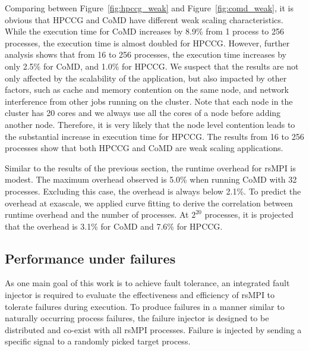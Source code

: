 Comparing between Figure~\ref{fig:hpccg_weak} and Figure~\ref{fig:comd_weak}, it is obvious that HPCCG and CoMD have different weak scaling characteristics. While the execution time for CoMD increases by 8.9\% from 1 process to 256 processes, the execution time is almost doubled for HPCCG. However, further analysis shows that from 16 to 256 processes, the execution time increases by only 2.5\% for CoMD, and 1.0\% for HPCCG. We suspect that the results are not only affected by the scalability of the application, but also impacted by other factors, such as cache and memory contention on the same node, and network interference from other jobs running on the cluster. Note that each node in the cluster has 20 cores and we always use all the cores of a node before adding another node. Therefore, it is very likely that the node level contention leads to the substantial increase in execution time for HPCCG. The results from 16 to 256 processes show that both HPCCG and CoMD are weak scaling applications. 

Similar to the results of the previous section, the runtime overhead for rsMPI is modest. The maximum overhead observed is 5.0\% when running CoMD with 32 processes. Excluding this case, the overhead is always below 2.1\%. To predict the overhead at exascale, we applied curve fitting to derive the correlation between runtime overhead and the number of processes. At $2^{20}$ processes, it is projected that the overhead is 3.1\% for CoMD and 7.6\% for HPCCG. 


\subsection{Performance under failures}

As one main goal of this work is to achieve fault tolerance, an integrated fault injector is required to evaluate the effectiveness and efficiency of rsMPI to tolerate failures during execution. 
To produce failures in a manner similar to naturally occurring process failures, the failure injector is designed to be distributed and co-exist with all rsMPI processes. Failure is injected by sending a specific signal to a randomly picked target process.

